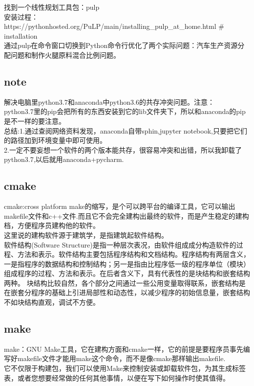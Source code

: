 \documentclass[UTF8]{ctexart}
\begin{document}
找到一个线性规划工具包：pulp\\
安装过程：https://pythonhosted.org/PuLP/main/installing_pulp_at_home.html
$\#$
installation\\

通过pulp在命令窗口切换到Python命令行优化了两个实际问题：汽车生产资源分配问题和制作火腿原料混合比例问题。\\
\subsection{note}
解决电脑里python3.7和anaconda中python3.6的共存冲突问题。注意：\\
python3.7里的pip会把所有的东西安装到它的lib文件夹下，所以和anaconda的pip是不一样的要注意。\\

总结:1.通过查阅网络资料发现，anaconda自带sphin,jupyter notebook,只要把它们的路径加到环境变量中即可使用。\\
     2.一定不要妄想一个软件的两个版本能共存，很容易冲突和出错，所以我卸载了python3.7,以后就用anaconda+pycharm.\\ \subsection{cmake}
cmake:cross platform make的缩写，是个可以跨平台的编译工具，它可以输出makefile文件和c++文件.而且它不会完全建构出最终的软件，而是产生稳定的建构档，方便程序员建构他的软件。\\
这里说的建构软件源于建筑学，是指建筑起软件结构。\\
软件结构(Software Structure)是指一种层次表况，由软件组成成分构造软件的过程、方法和表示。软件结构主要包括程序结构和文档结构。程序结构有两层含义，
一是指程序的数据结构和控制结构；另一是指由比程序低一级的程序单位（模块）组成程序的过程、方法和表示。在后者含义下，具有代表性的是块结构和嵌套结构两种。
块结构比较自然，各个部分之间通过一些公用变量取得联系，嵌套结构是在嵌套分程序的基础上引进局部性和动态性，以减少程序的初始信息量，嵌套结构不如块结构直观，调试不方便。\\
\subsection{make}
make：GNU Make工具，它在建构方面和cmake一样，它的前提是要程序员事先编写好makefile文件才能用make这个命令，而不是像cmake那样输出makefile.\\
它不仅限于构建包，我们可以使用Make来控制安装或卸载软件包，为其生成标签表，或者您想要经常做的任何其他事情，以便在写下如何操作时使其值得。\\
\end{document}
